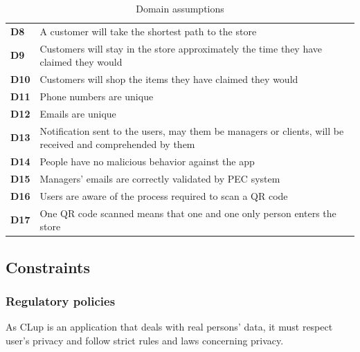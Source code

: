 \begin{table}[h!]
\begin{tabular}{@{}P{0.1\textwidth}P{0.80\textwidth}@{}}
        \textbf{D8}        & A customer will take the shortest path to the store\\ %
        \textbf{D9}        & Customers will stay in the store approximately the time they have claimed they would\\ %
        \textbf{D10}       & Customers will shop the items they have claimed they would\\
        \textbf{D11}       & Phone numbers are unique\\
        \textbf{D12}       & Emails are unique\\
        \textbf{D13}       & Notification sent to the users, may them be managers or clients, will be received and comprehended by them\\
        \textbf{D14}       & People have no malicious behavior against the app\\
        \textbf{D15}       & Managers' emails are correctly validated by PEC system\\
        \textbf{D16}       & Users are aware of the process required to scan a QR code\\
        \textbf{D17}       & One QR code scanned means that one and one only person enters the store\\
        \bottomrule
    \end{tabular}
\caption{Domain assumptions}
\label{table:domainassumptions}
\end{table}

\FloatBarrier

\subsection{Constraints}
\label{subsect:contraints}

\subsubsection{Regulatory policies}
\label{subsubsect:regulatorypolicies}

As CLup is an application that deals with real persons' data, it must respect user's privacy and follow strict rules and laws concerning privacy.

